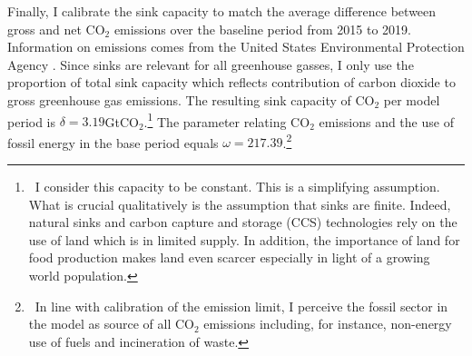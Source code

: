 Finally, I calibrate the sink capacity to match the average difference between gross and net CO$_2$ emissions over the baseline period from 2015 to 2019. Information on emissions comes from the United States Environmental Protection Agency \citep{EPAems}. Since sinks are relevant for all greenhouse gasses, I only use the proportion of total sink capacity which reflects contribution of carbon dioxide to gross greenhouse gas emissions. The resulting sink capacity of CO$_2$ per model period is $\delta=3.19$GtCO$_2$.\footnote{\ I consider this capacity to be constant. This is a simplifying assumption. What is crucial qualitatively is the assumption that sinks are finite. Indeed, natural sinks and carbon capture and storage (CCS) technologies rely on the use of land \citep{VanVuuren2018AlternativeTechnologies} which is in limited supply. In addition, the importance of land for food production makes land even scarcer especially in light of a growing world population.}
The parameter relating CO$_2$ emissions and the use of fossil energy in the base period equals $\omega=217.39$.\footnote{\  In line with calibration of the emission limit, I perceive the fossil sector in the model as source of all CO$_2$ emissions including, for instance, non-energy use of fuels and incineration of waste.}  

